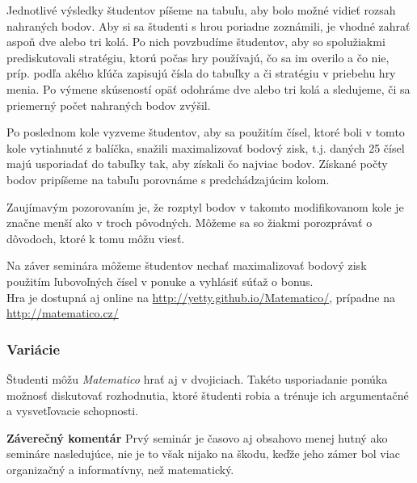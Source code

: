 {Jednotlivé výsledky študentov píšeme na tabuľu, aby bolo možné vidieť rozsah nahraných bodov. Aby si sa študenti s hrou poriadne zoznámili, je vhodné zahrať aspoň dve alebo tri kolá. Po nich povzbudíme študentov, aby so spolužiakmi prediskutovali stratégiu, ktorú počas hry používajú, čo sa im overilo a čo nie, príp. podľa akého kľúča zapisujú čísla do tabuľky a či stratégiu v priebehu hry menia. Po výmene skúseností opäť odohráme dve alebo tri kolá a sledujeme, či sa priemerný počet nahraných bodov zvýšil.

Po poslednom kole vyzveme študentov, aby sa použitím čísel, ktoré boli v tomto kole vytiahnuté z balíčka, snažili maximalizovať bodový zisk, t.j. daných 25 čísel majú usporiadať do tabuľky tak, aby získali čo najviac bodov. Získané počty bodov pripíšeme na tabuľu porovnáme s predchádzajúcim kolom.

Zaujímavým pozorovaním je, že rozptyl bodov v takomto modifikovanom kole je značne menší ako v troch pôvodných. Môžeme sa so žiakmi porozprávať o dôvodoch, ktoré k tomu môžu viesť.

Na záver seminára môžeme študentov nechať maximalizovať bodový zisk použitím ľubovoľných čísel v ponuke a vyhlásiť súťaž o bonus. \\

Hra je dostupná aj online na \url{http://yetty.github.io/Matematico/}, prípadne na \url{http://matematico.cz/}

\subsubsection*{Variácie}

Študenti môžu \textit{Matematico} hrať aj v dvojiciach. Takéto usporiadanie ponúka možnosť diskutovať rozhodnutia, ktoré študenti robia a trénuje ich argumentačné a vysvetľovacie schopnosti.

\textbf{Záverečný komentár}
Prvý seminár je časovo aj obsahovo menej hutný ako semináre nasledujúce, nie je to však nijako na škodu, keďže jeho zámer bol viac organizačný a informatívny, než matematický.
}
